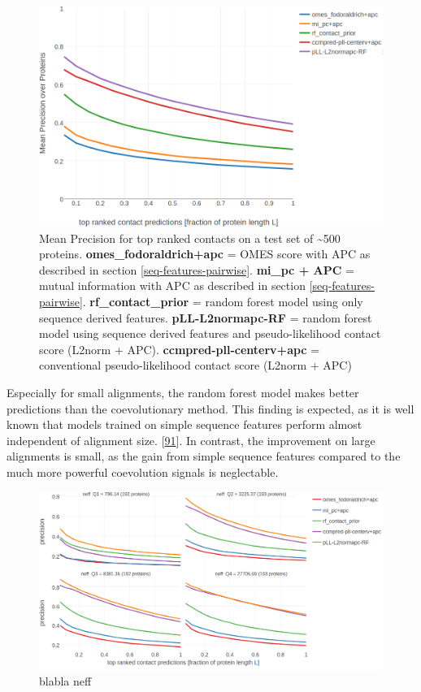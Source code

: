 \documentclass[12pt,a4paper,twoside]{book}
\theoremstyle{definition}
\theoremstyle{definition}
\theoremstyle{remark}
\begin{document}
\begin{figure}
\includegraphics[width=1\linewidth]{img/random_forest_contact_prior/precision_vs_rank_notitle} \caption{Mean Precision for top
ranked contacts on a test set of \textasciitilde{}500 proteins.
\textbf{omes\_fodoraldrich+apc} = OMES score with APC as described in
section \ref{seq-features-pairwise}. \textbf{mi\_pc + APC} = mutual
information with APC as described in section
\ref{seq-features-pairwise}. \textbf{rf\_contact\_prior} = random forest
model using only sequence derived features. \textbf{pLL-L2normapc-RF} =
random forest model using sequence derived features and
pseudo-likelihood contact score (L2norm + APC).
\textbf{ccmpred-pll-centerv+apc} = conventional pseudo-likelihood
contact score (L2norm + APC)}\label{fig:performance-rf-with-pll-score}
\end{figure}

Especially for small alignments, the random forest model makes better
predictions than the coevolutionary method. This finding is expected, as
it is well known that models trained on simple sequence features perform
almost independent of alignment size.
{[}\protect\hyperlink{ref-Stahl2017}{91}{]}. In contrast, the
improvement on large alignments is small, as the gain from simple
sequence features compared to the much more powerful coevolution signals
is neglectable.



\begin{figure}
\includegraphics[width=1\linewidth]{img/random_forest_contact_prior/precision_vs_rank_facetted_by_neff_notitle} \caption{blabla neff}\label{fig:performance-neff-rf-with-pll-score}
\end{figure}
\end{document}
